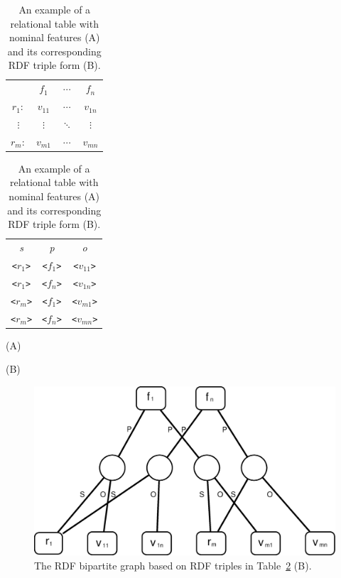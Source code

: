 \begin{table}[ht]
\begin{minipage}[c]{0.4\linewidth}\begin{flushright}
\begin{tabular}{ c | c | c | c |}
\cline{2-4}
	~   & $f_1$	    & $\cdots$  & $f_n$   \\
\cline{2-4}
$r_1:$	& $v_{11}$	& $\cdots$  & $v_{1n}$\\
\cline{2-4}
$\vdots$& $\vdots$  & $\ddots$  & $\vdots$\\
\cline{2-4}
$r_m:$	& $v_{m1}$	& $\cdots$  & $v_{mn}$\\
\cline{2-4}
\end{tabular}
\end{flushright}
\end{minipage}
\hfill
\begin{minipage}[c]{0.4\linewidth}
\begin{tabular}{c c c}
\emph{s}&   \emph{p}&  \emph{o}\\
\texttt{<$r_1$>}   &  \texttt{<$f_1$>}  &  \texttt{<$v_{11}$>}\\
\texttt{<$r_1$>}   &  \texttt{<$f_n$>}  &  \texttt{<$v_{1n}$>}\\
\texttt{<$r_m$>}   &  \texttt{<$f_1$>}  &  \texttt{<$v_{m1}$>}\\
\texttt{<$r_m$>}   &  \texttt{<$f_n$>}  &  \texttt{<$v_{mn}$>}\\
\end{tabular}
\end{minipage}
\begin{minipage}[c]{0.4\linewidth}\centering
\vspace{0.2cm}\hspace{2.8cm}(A)
\end{minipage}
\begin{minipage}[c]{0.4\linewidth}\centering
\vspace{0.2cm}\hspace{3.5cm}(B)
\end{minipage}
\caption[An example relational table with nominal features and the corresponding RDF]{\label{tbl:nominal-rel} An example of a relational table with nominal features (A) and its corresponding RDF triple form (B).}
\end{table}

\begin{figure}[tbh]
\begin{center}
\includegraphics[width=.5\textwidth]{fig/BG-relational-nominal.eps}
\end{center}
\caption[The RDF bipartite graph for a nominal-valued table]{\label{fig:BG-relational-nominal} The RDF bipartite graph based on RDF triples in Table~\ref{tbl:nominal-rel} (B).}
\end{figure}

